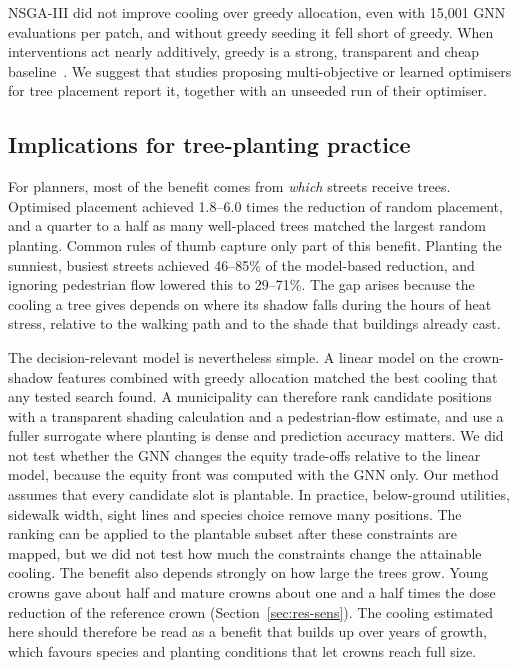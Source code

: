 \documentclass[preprint,12pt,authoryear]{elsarticle}
\begin{document}
NSGA-III did not improve cooling over greedy allocation, even with 15,001 GNN evaluations per patch, and without greedy seeding it fell short of greedy. When interventions act nearly additively, greedy is a strong, transparent and cheap baseline~\citep{nemhauser1978}. We suggest that studies proposing multi-objective or learned optimisers for tree placement report it, together with an unseeded run of their optimiser.

\subsection{Implications for tree-planting practice}

For planners, most of the benefit comes from \emph{which} streets receive trees. Optimised placement achieved 1.8--6.0 times the reduction of random placement, and a quarter to a half as many well-placed trees matched the largest random planting. Common rules of thumb capture only part of this benefit. Planting the sunniest, busiest streets achieved 46--85\% of the model-based reduction, and ignoring pedestrian flow lowered this to 29--71\%. The gap arises because the cooling a tree gives depends on where its shadow falls during the hours of heat stress, relative to the walking path and to the shade that buildings already cast.

The decision-relevant model is nevertheless simple. A linear model on the crown-shadow features combined with greedy allocation matched the best cooling that any tested search found. A municipality can therefore rank candidate positions with a transparent shading calculation and a pedestrian-flow estimate, and use a fuller surrogate where planting is dense and prediction accuracy matters. We did not test whether the GNN changes the equity trade-offs relative to the linear model, because the equity front was computed with the GNN only. Our method assumes that every candidate slot is plantable. In practice, below-ground utilities, sidewalk width, sight lines and species choice remove many positions. The ranking can be applied to the plantable subset after these constraints are mapped, but we did not test how much the constraints change the attainable cooling. The benefit also depends strongly on how large the trees grow. Young crowns gave about half and mature crowns about one and a half times the dose reduction of the reference crown (Section~\ref{sec:res-sens}). The cooling estimated here should therefore be read as a benefit that builds up over years of growth, which favours species and planting conditions that let crowns reach full size.
\end{document}
